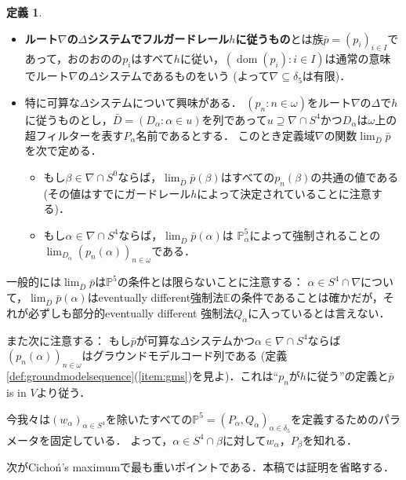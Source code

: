 \documentclass[uplatex,dvipdfmx]{jsarticle}
\newcommand{\dom}{\operatorname{dom}}
\newcommand{\Eor}{\mathbb{E}}
\newcommand{\Pa}{\mathbb{P}^5}
\theoremstyle{definition}
\newtheorem{defi}[thm]{定義}
\begin{document}
	\begin{defi}
		\begin{itemize} 
			\item \textbf{ルート$\nabla$の$\Delta$システムでフルガードレール$h$に従うもの}とは族$\bar p=(p_i)_{i\in I}$であって，おのおのの$p_i$はすべて$h$に従い，$(\dom(p_i):i\in I)$は通常の意味でルート$\nabla$の$\Delta$システムであるものをいう (よって$\nabla\subseteq \delta_5$は有限)．
			\item 
			特に可算な$\Delta$システムについて興味がある．  
			$(p_n:n\in \omega)$をルート$\nabla$の$\Delta$で$h$に従うものとし，$\bar
			D=(D_\alpha:\alpha\in u)$を列であって$u\supseteq \nabla \cap S^4$かつ$D_\alpha$は$\omega$上の超フィルターを表す$P_\alpha$名前であるとする．
			このとき定義域$\nabla$の関数$\lim_{\bar D}\bar p$を次で定める．
			\begin{itemize}
				\item もし$\beta\in \nabla\cap S^0 $ならば，$\lim_{\bar D}\bar p(\beta)$はすべての$p_n(\beta)$の共通の値である  (その値はすでにガードレール$h$によって決定されていることに注意する)．
				\item もし$\alpha\in \nabla\cap S^4$ならば，$\lim_{\bar D}\bar p(\alpha)$は
				$\Pa_\alpha$によって強制されることの$\lim_{D_\alpha}(p_n(\alpha))_{n\in \omega}$である．  
				
			\end{itemize}
		\end{itemize}
	\end{defi}

	一般的には$\lim_{\bar D}\bar p$は$\Pa$の条件とは限らないことに注意する： 
$\alpha\in S^4\cap \nabla$について，$\lim_{\bar D}\bar p(\alpha)$はeventually different強制法$\Eor$の条件であることは確かだが，それが必ずしも部分的eventually different 強制法$Q_{\alpha}$に入っているとは言えない． 
		
	また次に注意する：
	もし$\bar p$が可算な$\Delta$システムかつ$\alpha\in\nabla\cap S^4$ならば$(p_n(\alpha))_{n\in\omega}$はグラウンドモデルコード列である
	(定義\ref{def:groundmodelsequence}(\ref{item:gms})を見よ)．これは``$p_n$が$h$に従う''の定義と$\bar p$ is in $V$より従う．
	
	今我々は$(w_\alpha)_{\alpha\in S^4}$を除いたすべての$\Pa=(P_\alpha,Q_\alpha)_{\alpha\in \delta_5}$を定義するためのパラメータを固定している．
	よって，$\alpha\in S^4\cap \beta$に対して$w_\alpha$，$P_\beta$を知れる．
	
	次がCichoń's maximumで最も重いポイントである．本稿では証明を省略する．
	
\end{document}
